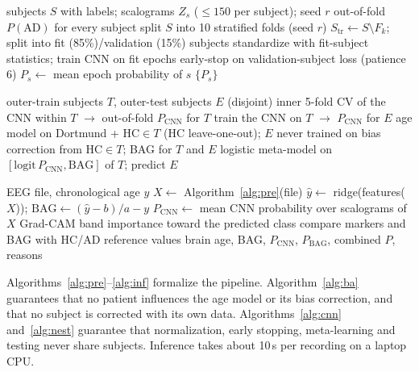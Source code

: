 \documentclass[journal]{IEEEtran}
\begin{document}
\begin{algorithm}[t]
\caption{Subject-level cross-validation of the CNN}
\label{alg:cnn}
\begin{algorithmic}[1]
\Require subjects $S$ with labels; scalograms $Z_s$ ($\le150$ per subject); seed $r$
\Ensure out-of-fold $P(\mathrm{AD})$ for every subject
\State split $S$ into 10 stratified folds (seed $r$)
  \State $S_\mathrm{tr}\gets S\setminus F_k$; split into fit (85\%)/validation (15\%) subjects
  \State standardize with fit-subject statistics; train CNN on fit epochs
  \State early-stop on validation-subject loss (patience 6)
   \State $P_s\gets$ mean epoch probability of $s$ \EndFor
\EndFor
\State \Return $\{P_s\}$ 
\end{algorithmic}
\end{algorithm}

\begin{algorithm}[t]
\caption{Fully nested stacking (outer fold $k$)}
\label{alg:nest}
\begin{algorithmic}[1]
\Require outer-train subjects $T$, outer-test subjects $E$ (disjoint)
\State inner 5-fold CV of the CNN within $T$ $\rightarrow$ out-of-fold $P_\mathrm{CNN}$ for $T$
\State train the CNN on $T$ $\rightarrow$ $P_\mathrm{CNN}$ for $E$
\State age model on Dortmund + HC$\in T$ (HC leave-one-out); $E$ never trained on
\State bias correction from HC$\in T$; BAG for $T$ and $E$
\State logistic meta-model on $[\mathrm{logit}\,P_\mathrm{CNN},\mathrm{BAG}]$ of $T$; predict $E$
\end{algorithmic}
\end{algorithm}

\begin{algorithm}[t]
\caption{Inference and report for a new subject}
\label{alg:inf}
\begin{algorithmic}[1]
\Require EEG file, chronological age $y$
\State $X\gets$ Algorithm~\ref{alg:pre}(file)
\State $\hat y\gets$ ridge(features($X$)); $\mathrm{BAG}\gets(\hat y-b)/a-y$
\State $P_\mathrm{CNN}\gets$ mean CNN probability over scalograms of $X$
\State Grad-CAM band importance toward the predicted class
\State compare markers and BAG with HC/AD reference values
\State \Return brain age, BAG, $P_\mathrm{CNN}$, $P_\mathrm{BAG}$, combined $P$, reasons
\end{algorithmic}
\end{algorithm}

Algorithms~\ref{alg:pre}--\ref{alg:inf} formalize the pipeline. Algorithm~\ref{alg:ba} guarantees that no patient influences the age model or its bias correction, and that no subject is corrected with its own data. Algorithms~\ref{alg:cnn} and~\ref{alg:nest} guarantee that normalization, early stopping, meta-learning and testing never share subjects. Inference takes about 10\,s per recording on a laptop CPU.
\end{document}
